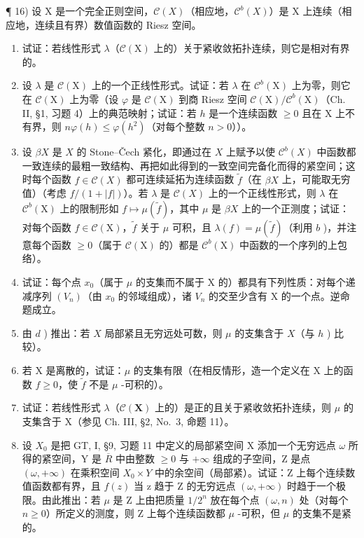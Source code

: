 ¶ 16) 设 X 是一个完全正则空间，\(\mathcal{C}(X)\)（相应地，\(\mathcal{C}^b(X)\)）是 X 上连续（相应地，连续且有界）数值函数的 Riesz 空间。

\begin{enumerate}
\def\labelenumi{\alph{enumi})}
\item
  试证：若线性形式 \(\lambda\)（\(\mathcal{C}(\mathrm{X})\) 上的）关于紧收敛拓扑连续，则它是相对有界的。
\item
  设 \(\lambda\) 是 \(\mathcal{C}(\mathrm{X})\) 上的一个正线性形式。试证：若 \(\lambda\) 在 \(\mathcal{C}^b (\mathrm{X})\) 上为零，则它在 \(\mathcal{C}(\mathrm{X})\) 上为零（设 \(\varphi\) 是 \(\mathcal{C}(\mathrm{X})\) 到商 Riesz 空间 \(\mathcal{C}(\mathrm{X}) / \mathcal{C}^b (\mathrm{X})\)（Ch. II, §1, 习题 4）上的典范映射；试证：若 \(h\) 是一个连续函数 \(\geqslant 0\) 且在 \(\mathrm{X}\) 上不有界，则 \(n\varphi (h)\leqslant \varphi (h^{2})\)（对每个整数 \(n > 0\)））。
\item
  设 \(\beta X\) 是 \(X\) 的 Stone--Čech 紧化，即通过在 \(X\) 上赋予以使 \(\mathcal{C}^b(X)\) 中函数都一致连续的最粗一致结构、再把如此得到的一致空间完备化而得的紧空间；这时每个函数 \(f \in \mathcal{C}(X)\) 都可连续延拓为连续函数 \(\widetilde{f}\)（在 \(\beta X\) 上，可能取无穷值）（考虑 \(f/(1 + |f|)\)）。若 \(\lambda\) 是 \(\mathcal{C}(X)\) 上的一个正线性形式，则 \(\lambda\) 在 \(\mathcal{C}^b (\mathrm{X})\) 上的限制形如 \(f\mapsto \mu (\widetilde{f})\)，其中 \(\mu\) 是 \(\beta X\) 上的一个正测度；试证：对每个函数 \(f\in \mathcal{C}(\mathrm{X})\)，\(\widetilde{f}\) 关于 \(\mu\) 可积，且 \(\lambda (f) = \mu (\widetilde{f})\)（利用 \(b\) )，并注意每个函数 \(\geqslant 0\)（属于 \(\mathcal{C}(\mathrm{X})\) 的）都是 \(\mathcal{C}^b (\mathrm{X})\) 中函数的一个序列的上包络）。
\item
  试证：每个点 \(x_{0}\)（属于 \(\mu\) 的支集而不属于 X 的）都具有下列性质：对每个递减序列 \((V_{n})\)（由 \(x_{0}\) 的邻域组成），诸 \(V_{n}\) 的交至少含有 X 的一个点。逆命题成立。
\item
  由 \(d\) ) 推出：若 \(X\) 局部紧且无穷远处可数，则 \(\mu\) 的支集含于 \(X\)（与 \(h\) ) 比较）。
\item
  若 X 是离散的，试证：\(\mu\) 的支集有限（在相反情形，造一个定义在 X 上的函数 \(f \geqslant 0\)，使 \(\widetilde{f}\) 不是 \(\mu\) -可积的）。
\item
  试证：若线性形式 \(\lambda\)（\(\mathcal{C}(\mathbf{X})\) 上的）是正的且关于紧收敛拓扑连续，则 \(\mu\) 的支集含于 X（参见 Ch. III, §2, No.~3, 命题 11）。
\item
  设 \(X_{0}\) 是把 GT, I, §9, 习题 11 中定义的局部紧空间 X 添加一个无穷远点 \(\omega\) 所得的紧空间，Y 是 \(\overline{R}\) 中由整数 \(\geqslant 0\) 与 \(+\infty\) 组成的子空间，Z 是点 \((\omega, +\infty)\) 在乘积空间 \(X_{0} \times Y\) 中的余空间（局部紧）。试证：Z 上每个连续数值函数都有界，且 \(f(z)\) 当 z 趋于 Z 的无穷远点 \((\omega, +\infty)\) 时趋于一个极限。由此推出：若 \(\mu\) 是 Z 上由把质量 \(1/2^{n}\) 放在每个点 \((\omega, n)\) 处（对每个 \(n \geqslant 0\)）所定义的测度，则 Z 上每个连续函数都 \(\mu\) -可积，但 \(\mu\) 的支集不是紧的。
\end{enumerate}


